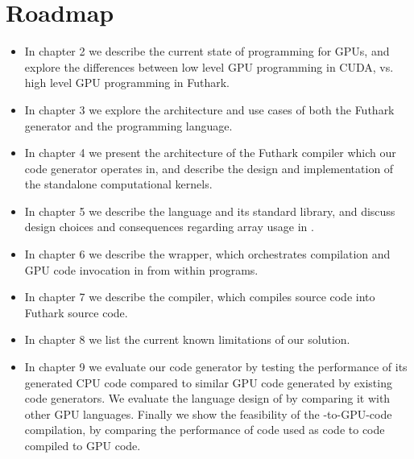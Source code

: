 \section{Roadmap}
\begin{itemize}
\item In chapter 2 we describe the current state of programming for GPUs, and
  explore the differences between low level GPU programming in CUDA, vs. high
  level GPU programming in Futhark.

\item In chapter 3 we explore the architecture and use cases of both the Futhark
  \csharp{} generator and the \fshark{} programming language.
  
\item In chapter 4 we present the architecture of the Futhark compiler which
  our \csharp{} code generator operates in, and describe the design and
  implementation of the standalone \csharp{} computational kernels.

\item In chapter 5 we describe the \fshark{} language and its standard library,
  and discuss design choices and consequences regarding array usage in
  \fshark{}.

\item In chapter 6 we describe the \fshark{} wrapper, which orchestrates
  \fshark{} compilation and GPU code invocation in from within \fsharp{} programs.
  
\item In chapter 7 we describe the \fshark{} compiler, which compiles \fshark{}
  source code into Futhark source code.
  
\item In chapter 8 we list the current known limitations of our solution.

\item In chapter 9 we evaluate our code generator by testing the performance of
  its generated CPU code compared to similar GPU code generated by existing code
  generators.
  We evaluate the language design of \fshark{} by comparing it with other GPU
  languages. Finally we show the feasibility of the \fsharp{}-to-GPU-code
  compilation, by comparing the performance of \fshark{} code used as \fsharp{}
  code to \fshark{} code compiled to GPU code.
\end{itemize}

